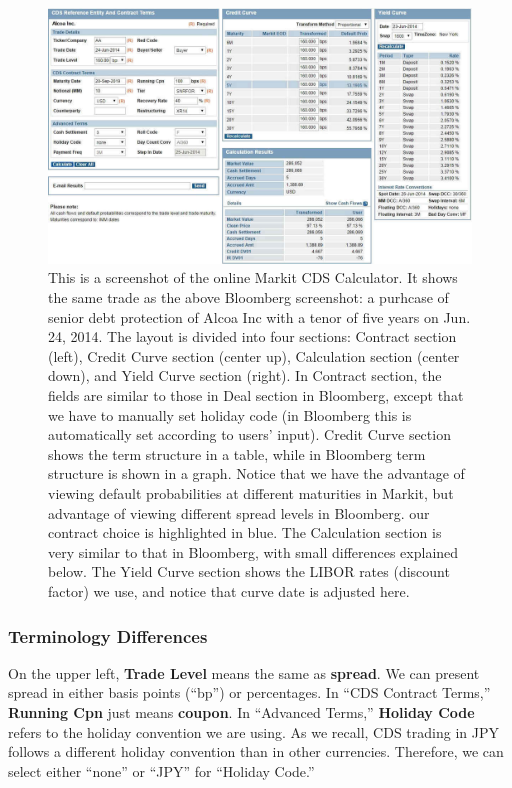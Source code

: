 \documentclass{jss}
\begin{document}
\begin{figure}[H]
\centering
\includegraphics[width=\textwidth]{images/MarkitCDSAlcoa.jpg}
\caption{\label{fig:AlcoaRates}
This is a screenshot of the online Markit CDS Calculator. It shows the same trade as the above Bloomberg screenshot: a purhcase of senior debt protection of Alcoa Inc with a tenor of five years on Jun. 24, 2014. The layout is divided into four sections: Contract section (left), Credit Curve section (center up), Calculation section (center down), and Yield Curve section (right). In Contract section, the fields are similar to those in Deal section in Bloomberg, except that we have to manually set holiday code (in Bloomberg this is automatically set according to users' input). Credit Curve section shows the term structure in a table, while in Bloomberg term structure is shown in a graph. Notice that we have the advantage of viewing default probabilities at different maturities in Markit, but advantage of viewing different spread levels in Bloomberg. our contract choice is highlighted in blue. The Calculation section is very similar to that in Bloomberg, with small differences explained below. The Yield Curve section shows the LIBOR rates (discount factor) we use, and notice that curve date is adjusted here.
}
\end{figure}

\subsubsection{Terminology Differences}
On the upper left, \textbf{Trade Level} means the same as \textbf{spread}. We can present spread in either basis points (``bp'') or percentages. In ``CDS Contract Terms,'' \textbf{Running Cpn} just means \textbf{coupon}. In ``Advanced Terms,'' \textbf{Holiday Code} refers to the holiday convention we are using. As we recall, CDS trading in JPY follows a different holiday convention than in other currencies. Therefore, we can select either ``none'' or ``JPY'' for ``Holiday Code.''
\end{document}
